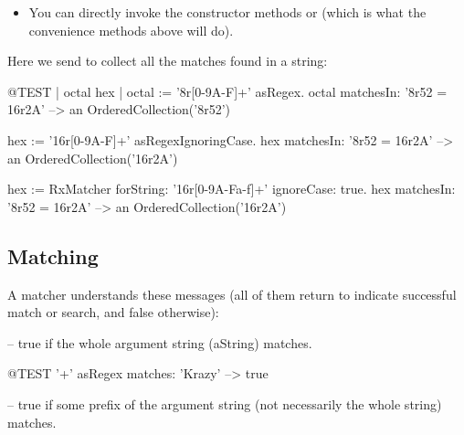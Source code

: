 \documentclass[a4paper,10pt,twoside]{book}
\begin{document}
{\begin{itemize}
\item You can directly invoke the  constructor methods  or  (which is what the convenience methods above will do).
%

\end{itemize}

Here we send  to collect all the matches found in a string:

\begin{code}{@TEST | octal hex |}
octal := '8r[0-9A-F]+' asRegex.
octal matchesIn: '8r52 = 16r2A' --> an OrderedCollection('8r52')

hex := '16r[0-9A-F]+' asRegexIgnoringCase.
hex matchesIn: '8r52 = 16r2A'   --> an OrderedCollection('16r2A')

hex := RxMatcher forString: '16r[0-9A-Fa-f]+' ignoreCase: true.
hex matchesIn: '8r52 = 16r2A'   --> an OrderedCollection('16r2A')
\end{code}

\subsection{Matching}

A matcher understands these messages (all of them return  to indicate successful match or search, and false otherwise):

 -- true if the whole argument string (aString) matches.

\begin{code}{@TEST}
'\w+' asRegex matches: 'Krazy' --> true
\end{code}


 -- true if some prefix of the argument string (not necessarily the whole string) matches.

}
\end{document}
